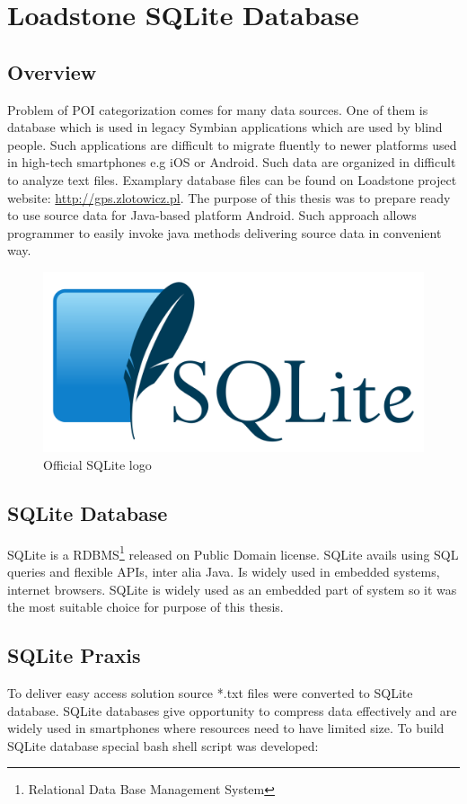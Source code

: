 \chapter{Loadstone SQLite Database}\label{chap.loadstone}

\section{Overview}
Problem of POI categorization comes for many data sources. One of them is database which is used in legacy Symbian applications which are used by blind people. Such applications are difficult to migrate fluently to newer platforms used in high-tech smartphones e.g iOS or Android. Such data are organized in difficult to analyze text files. Examplary database files can be found on Loadstone project website: \url{http://gps.zlotowicz.pl}. The purpose of this thesis was to prepare ready to use source data for Java-based platform Android. Such approach allows programmer to easily invoke java methods delivering source data in convenient way.

\begin{figure}
	\centering
	\includegraphics[scale=0.2]{SQLiteLogo}
	\caption{Official SQLite logo}
	\label{fig:sqlitelogo}
\end{figure}

\section{SQLite Database}
SQLite is a RDBMS\footnote{Relational Data Base Management System} released on Public Domain license. SQLite avails using SQL queries and flexible APIs, inter alia Java. Is widely used in embedded systems, internet browsers. SQLite is widely used as an embedded part of system so it was the most suitable choice for purpose of this thesis.
\section{SQLite Praxis}
To deliver easy access solution source *.txt files were converted to SQLite database. SQLite databases give opportunity to compress data effectively and are widely used in smartphones where resources need to have limited size. To build SQLite database special bash shell script was developed:

